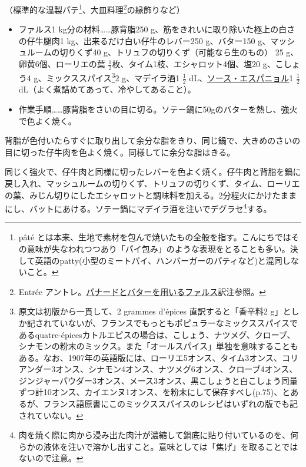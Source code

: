 \begin{recette}


（標準的な温製パテ\footnote{pâté
  とは本来、生地で素材を包んで焼いたもの全般を指す。こんにちではその意味が失なわれつつあり「パイ包み」のような表現をとることも多い。決して英語のpatty(小型のミートパイ、ハンバーガーのパティなど)と混同しないこと。}、大皿料理\footnote{Entrée
  アントレ。\protect\hyperlink{panade-a}{パナードとバターを用いるファルス}訳注参照。}の縁飾りなど）

\begin{itemize}
\item
  ファルス1 kg分の材料\ldots{}\ldots{}豚背脂250
  g、筋をきれいに取り除いた極上の白さの仔牛腿肉1
  kg、出来るだけ白い仔牛のレバー250 g、バター150
  g、マッシュルームの切りくず40
  g、トリュフの切りくず（可能なら生のもの） 25 g、卵黄6個、ローリエの葉
  \(\frac{1}{2}\)枚、タイム1枝、エシャロット4個、塩20 g、こしょう4
  g、ミックススパイス\footnote{原文は初版から一貫して、2 grammes
    d'épices 直訳すると「香辛料2
    g」としか記されていないが、フランスでもっともポピュラーなミックススパイスであるquatre-épicesカトルエピスの場合は、こしょう、ナツメグ、クローブ、シナモンの粉末のミックス。また「オールスパイス」単独を意味することもある。なお、1907年の英語版には、ローリエ5オンス、タイム3オンス、コリアンダー3オンス、シナモン4オンス、ナツメグ6オンス、クローブ4オンス、ジンジャーパウダー3オンス、メース3オンス、黒こしょうと白こしょう同量ずつ計10オンス、カイエンヌ1オンス、を粉末にして保存すべし(p.75)、とあるが、フランス語原書にこのミックススパイスのレシピはいずれの版でも記されていない。}2
  g、マデイラ酒1 \(\frac{1}{2}\)
  dL、\protect\hyperlink{sauce-espagnole}{ソース・エスパニョル}1
  \(\frac{1}{2}\) dL（よく煮詰めてあって、冷やしてあること）。
\item
  作業手順\ldots{}\ldots{}豚背脂をさいの目に切る。ソテー鍋に50gのバターを熱し、強火で色よく焼く。
\end{itemize}

背脂が色付いたらすぐに取り出して余分な脂をきり、同じ鍋で、大きめのさいの目に切った仔牛肉を色よく焼く。同様してに余分な脂はきる。

同じく強火で、仔牛肉と同様に切ったレバーを色よく焼く。仔牛肉と背脂を鍋に戻し入れ、マッシュルームの切りくず、トリュフの切りくず、タイム、ローリエの葉、みじん切りにしたエシャロットと調味料を加える。2分程火にかけたままにし、バットにあける。ソテー鍋にマデイラ酒を注いでデグラセ\footnote{肉を焼く際に肉から浸み出た肉汁が濃縮して鍋底に貼り付いているのを、何らかの液体を注いで溶かし出すこと。意味としては「焦げ」を取ることではないので注意。}する。


\end{recette}
